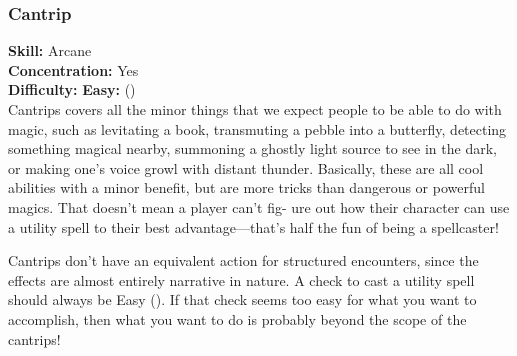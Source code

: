\subsubsection{Cantrip}
\textbf{Skill:} Arcane\\
\textbf{Concentration:} Yes\\
\textbf{Difficulty:} \textbf{Easy:} (\difficulty)\\
Cantrips covers all the minor things that we expect
people to be able to do with magic, such as levitating a
book, transmuting a pebble into a butterfly, detecting
something magical nearby, summoning a ghostly light
source to see in the dark, or making one’s voice growl
with distant thunder. Basically, these are all cool abilities
with a minor benefit, but are more tricks than dangerous
or powerful magics. That doesn’t mean a player can't fig-
ure out how their character can use a utility spell to their
best advantage—that’s half the fun of being a spellcaster!

Cantrips don't have an equivalent action for
structured encounters, since the effects are almost
entirely narrative in nature. A check to cast a utility spell
should always be Easy (\difficulty). If that check seems too easy
for what you want to accomplish, then what you want to
do is probably beyond the scope of the cantrips!

